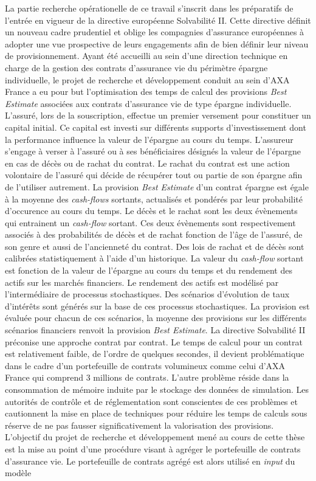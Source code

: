 La partie recherche opérationelle de ce travail s\rq{}inscrit dans les préparatifs de l\rq{}entrée en vigueur de la directive européenne Solvabilité II. Cette directive définit un nouveau cadre prudentiel et oblige les compagnies d\rq{}assurance européennes à adopter une vue prospective de leurs engagements afin de bien définir leur niveau de provisionnement. Ayant été accueilli au sein d\rq{}une direction technique en charge de la gestion des contrats d\rq{}assurance vie du périmètre épargne individuelle, le projet de recherche et développement conduit au sein d\rq{}AXA France a eu pour but l\rq{}optimisation des temps de calcul des provisions \textit{Best Estimate} associées aux contrats d\rq{}assurance vie de type épargne individuelle. L\rq{}assuré, lors de la souscription, effectue un premier versement pour constituer un capital initial. Ce capital est investi sur différents supports d\rq{}investissement dont la performance influence la valeur de l\rq{}épargne au cours du temps. L\rq{}assureur s\rq{}engage à verser à l\rq{}assuré ou à ses bénéficiaires désignés la valeur de l\rq{}épargne en cas de décès ou de rachat du contrat. Le rachat du contrat est une action volontaire de l\rq{}assuré qui décide de récupérer tout ou partie de son épargne afin de l\rq{}utiliser autrement. La provision \textit{Best Estimate} d\rq{}un contrat épargne est égale à la moyenne des \textit{cash-flows} sortants, actualisés et pondérés par leur probabilité d\rq{}occurence au cours du temps. Le décès et le rachat sont les deux évènements qui entrainent un \textit{cash-flow} sortant. Ces deux évènements sont respectivement associés à des probabilités de décès et de rachat fonction de l\rq{}âge de l\rq{}assuré, de son genre et aussi de l\rq{}ancienneté du contrat. Des lois de rachat et de décès sont calibrées statistiquement à l\rq{}aide d\rq{}un historique. La valeur du \textit{cash-flow} sortant est fonction de la valeur de l\rq{}épargne au cours du temps et du rendement des actifs sur les marchés financiers. Le rendement des actifs est modélisé par l\rq{}intermédiaire de processus stochastiques. Des scénarios d\rq{}évolution de taux d\rq{}intérêts sont générés sur la base de ces processus stochastiques. La provision est évaluée pour chacun de ces scénarios, la moyenne des provisions sur les différents scénarios financiers renvoit la provision \textit{Best Estimate}. La directive Solvabilité II préconise une approche contrat par contrat. Le temps de calcul pour un contrat est relativement faible, de l\rq{}ordre de quelques secondes, il devient problématique dans le cadre d\rq{}un portefeuille de contrats volumineux comme celui d\rq{}AXA France qui comprend $3$ millions de contrats. L\rq{}autre problème réside dans la consommation de mémoire induite par le stockage des données de simulation. Les autorités de contrôle et de réglementation sont conscientes de ces problèmes et cautionnent la mise en place de techniques pour réduire les temps de calculs sous réserve de ne pas fausser significativement la valorisation des provisions.  L'objectif du projet de recherche et développement mené au cours de cette thèse est la mise au point d'une procédure visant à agréger le portefeuille de contrats d\rq{}assurance vie. Le portefeuille de contrats agrégé est alors utilisé en \textit{input} du modèle 